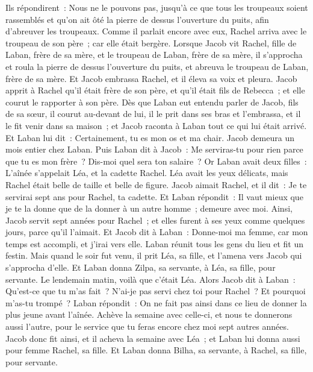 \begin{multicols}{2}
Ils répondirent~: Nous ne le pouvons pas, jusqu'à ce que tous les troupeaux soient rassemblés et qu'on ait ôté la pierre de dessus l'ouverture du puits, afin d'abreuver les troupeaux.
Comme il parlait encore avec eux, Rachel arriva avec le troupeau de son père~; car elle était bergère.
Lorsque Jacob vit Rachel, fille de Laban, frère de sa mère, et le troupeau de Laban, frère de sa mère, il s'approcha et roula la pierre de dessus l'ouverture du puits, et abreuva le troupeau de Laban, frère de sa mère.
Et Jacob embrassa Rachel, et il éleva sa voix et pleura.
Jacob apprit à Rachel qu'il était frère de son père, et qu'il était fils de Rebecca~; et elle courut le rapporter à son père.
Dès que Laban eut entendu parler de Jacob, fils de sa sœur, il courut au-devant de lui, il le prit dans ses bras et l'embrassa, et il le fit venir dans sa maison~; et Jacob raconta à Laban tout ce qui lui était arrivé.
Et Laban lui dit~: Certainement, tu es mon os et ma chair. Jacob demeura un mois entier chez Laban.
Puis Laban dit à Jacob~: Me serviras-tu pour rien parce que tu es mon frère~? Dis-moi quel sera ton salaire~?
Or Laban avait deux filles~: L'aînée s'appelait Léa, et la cadette Rachel.
Léa avait les yeux délicats, mais Rachel était belle de taille et belle de figure.
Jacob aimait Rachel, et il dit~: Je te servirai sept ans pour Rachel, ta cadette.
Et Laban répondit~: Il vaut mieux que je te la donne que de la donner à un autre homme~; demeure avec moi.
Ainsi, Jacob servit sept années pour Rachel~; et elles furent à ses yeux comme quelques jours, parce qu'il l'aimait.
Et Jacob dit à Laban~: Donne-moi ma femme, car mon temps est accompli, et j'irai vers elle.
Laban réunit tous les gens du lieu et fit un festin.
Mais quand le soir fut venu, il prit Léa, sa fille, et l'amena vers Jacob qui s'approcha d'elle.
Et Laban donna Zilpa, sa servante, à Léa, sa fille, pour servante.
Le lendemain matin, voilà que c'était Léa. Alors Jacob dit à Laban~: Qu'est-ce que tu m'as fait~? N'ai-je pas servi chez toi pour Rachel~? Et pourquoi m'as-tu trompé~?
Laban répondit~: On ne fait pas ainsi dans ce lieu de donner la plus jeune avant l'aînée.
Achève la semaine avec celle-ci, et nous te donnerons aussi l'autre, pour le service que tu feras encore chez moi sept autres années.
Jacob donc fit ainsi, et il acheva la semaine avec Léa~; et Laban lui donna aussi pour femme Rachel, sa fille.
Et Laban donna Bilha, sa servante, à Rachel, sa fille, pour servante.

\end{multicols}
